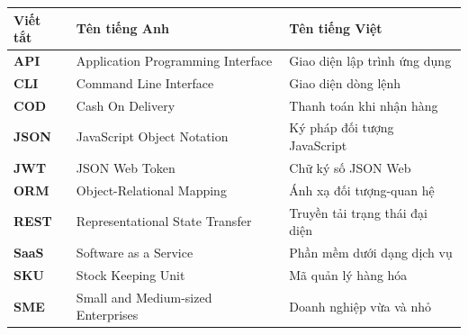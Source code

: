 \documentclass[../main.tex]{subfiles}
\begin{document}
\begin{longtable}{l p{6cm} p{7cm}}
	\hline
   \textbf{Viết tắt}  & \textbf{Tên tiếng Anh}	& \textbf{Tên tiếng Việt} \\ \hline 
	\textbf{API} & Application Programming Interface & Giao diện lập trình ứng dụng \\
	\textbf{CLI} & Command Line Interface & Giao diện dòng lệnh \\
	\textbf{COD} & Cash On Delivery & Thanh toán khi nhận hàng \\
	\textbf{JSON} & JavaScript Object Notation & Ký pháp đối tượng JavaScript \\
	\textbf{JWT} & JSON Web Token & Chữ ký số JSON Web \\
	\textbf{ORM} & Object-Relational Mapping & Ánh xạ đối tượng-quan hệ \\
	\textbf{REST} & Representational State Transfer & Truyền tải trạng thái đại diện \\
	\textbf{SaaS} & Software as a Service & Phần mềm dưới dạng dịch vụ \\
	\textbf{SKU} & Stock Keeping Unit & Mã quản lý hàng hóa \\
	\textbf{SME} & Small and Medium-sized Enterprises & Doanh nghiệp vừa và nhỏ \\

    \hline
\end{longtable}
\end{document}
